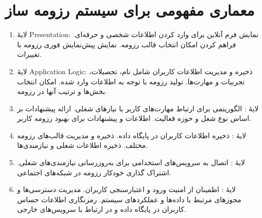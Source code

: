 \documentclass[]{article}
\begin{document}
	\section{\huge{معماری مفهومی برای سیستم رزومه ساز}}
	\begin{enumerate}
	\item 
	لایۀ {Presentation}\lr:
	\subitem
	\subsubitem
	نمایش فرم آنلاین برای وارد کردن اطلاعات شخصی و حرفه‌ای.
	\subsubitem
	فراهم کردن امکان انتخاب قالب رزومه.
	\subsubitem
	نمایش پیش‌نمایش فوری رزومه با تغییرات.
	\item 
	لایۀ {Application Logic}\lr:
	\subitem
	\subsubitem
	ذخیره و مدیریت اطلاعات کاربران شامل نام، تحصیلات، تجربیات و مهارت‌ها.
	\subitem
	\subsubitem
	تولید رزومه با توجه به اطلاعات وارد شده.
	\subsubitem
	امکان انتخاب بخش‌ها و ترتیب آنها در رزومه.
	\item 
	لایۀ :
	\subitem
	\subsubitem
	الگوریتمی برای ارتباط مهارت‌های کاربر با نیازهای شغلی.
	\subitem
	\subsubitem
	ارائه پیشنهادات بر اساس نوع شغل و حوزه فعالیت.
	\subitem
	\subsubitem
	اطلاعات و پیشنهادات برای بهبود رزومه کاربر.
	
	\item 
	لایۀ :
	\subitem
	\subsubitem
	ذخیره اطلاعات کاربران در پایگاه داده.
	\subitem
	\subsubitem
	ذخیره و مدیریت قالب‌های رزومه مختلف.
	\subitem
	\subsubitem
	ذخیره اطلاعات شغلی و نیازمندی‌ها.
	
	\item 
	لایۀ :
	\subitem
	\subsubitem
	اتصال به سرویس‌های استخدامی برای به‌روزرسانی نیازمندی‌های شغلی.
	\subsubitem
	اشتراک گذاری خودکار رزومه در شبکه‌های اجتماعی.
	\item
	لایۀ :
	\subitem
	\subsubitem
	اطمینان از امنیت ورود و اعتبارسنجی کاربران.
	\subsubitem
	مدیریت دسترسی‌ها و مجوزهای مرتبط با داده‌ها و عملکردهای سیستم.
	\subitem
	\subsubitem
	رمزنگاری اطلاعات حساس کاربران در پایگاه داده و در ارتباط با سرویس‌های خارجی.
	\subitem
	
	\end{enumerate}
	
\end{document}
